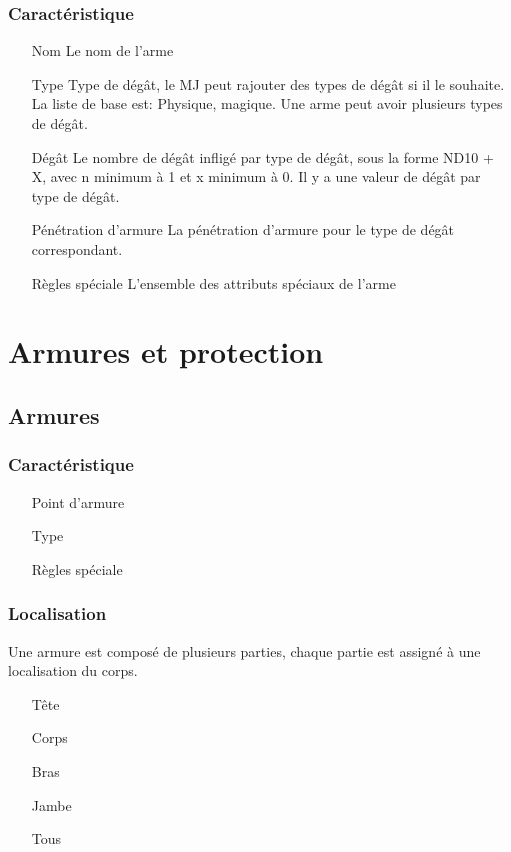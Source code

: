 \subsubsection{Caractéristique}
\begin{itemize}
\item[Nom] Le nom de l'arme
\item[Type] Type de dégât, le MJ peut rajouter des types de dégât si il le souhaite. La liste de base est: Physique, magique. Une arme peut avoir plusieurs types de dégât.
\item[Dégât] Le nombre de dégât infligé par type de dégât, sous la forme ND10 + X, avec n minimum à 1 et x minimum à 0. Il y a une valeur de dégât par type de dégât. 
\item[Pénétration d'armure] La pénétration d'armure pour le type de dégât correspondant. 
\item[Règles spéciale] L'ensemble des attributs spéciaux de l'arme
\end{itemize}

\section{Armures et protection}
\subsection{Armures}
\subsubsection{Caractéristique}
\begin{itemize}
\item[Point d'armure]
\item[Type]
\item[Règles spéciale]
\end{itemize}
\subsubsection{Localisation}
Une armure est composé de plusieurs parties, chaque partie est assigné à une localisation du corps. \\
\begin{itemize}
\item[Tête]
\item[Corps]
\item[Bras]
\item[Jambe]
\item[Tous]
\end{itemize}
